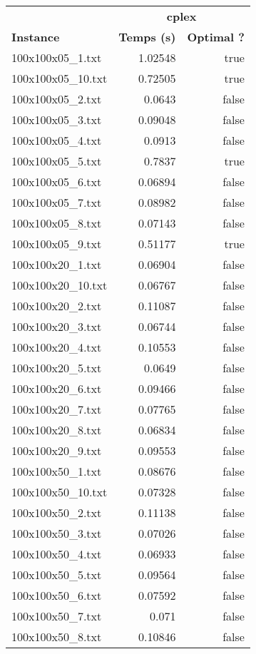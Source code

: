 \documentclass{article}
\begin{document}
\begin{center}
\renewcommand{\arraystretch}{1.4} 
 \begin{tabular}{lrr}
	\hline
 & \multicolumn{2}{c}{\textbf{cplex}}\\
\textbf{Instance}  & \textbf{Temps (s)} & \textbf{Optimal ?} \\\hline

100x100x05\_1.txt & 1.02548 & true
\\
100x100x05\_10.txt & 0.72505 & true
\\
100x100x05\_2.txt & 0.0643 & false
\\
100x100x05\_3.txt & 0.09048 & false
\\
100x100x05\_4.txt & 0.0913 & false
\\
100x100x05\_5.txt & 0.7837 & true
\\
100x100x05\_6.txt & 0.06894 & false
\\
100x100x05\_7.txt & 0.08982 & false
\\
100x100x05\_8.txt & 0.07143 & false
\\
100x100x05\_9.txt & 0.51177 & true
\\
100x100x20\_1.txt & 0.06904 & false
\\
100x100x20\_10.txt & 0.06767 & false
\\
100x100x20\_2.txt & 0.11087 & false
\\
100x100x20\_3.txt & 0.06744 & false
\\
100x100x20\_4.txt & 0.10553 & false
\\
100x100x20\_5.txt & 0.0649 & false
\\
100x100x20\_6.txt & 0.09466 & false
\\
100x100x20\_7.txt & 0.07765 & false
\\
100x100x20\_8.txt & 0.06834 & false
\\
100x100x20\_9.txt & 0.09553 & false
\\
100x100x50\_1.txt & 0.08676 & false
\\
100x100x50\_10.txt & 0.07328 & false
\\
100x100x50\_2.txt & 0.11138 & false
\\
100x100x50\_3.txt & 0.07026 & false
\\
100x100x50\_4.txt & 0.06933 & false
\\
100x100x50\_5.txt & 0.09564 & false
\\
100x100x50\_6.txt & 0.07592 & false
\\
100x100x50\_7.txt & 0.071 & false
\\
100x100x50\_8.txt & 0.10846 & false
\\
\hline\end{tabular}
\end{center}
\end{document}
